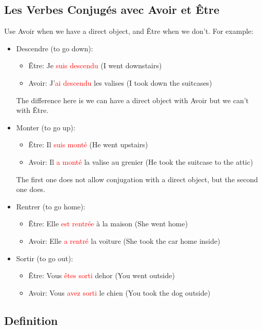 \documentclass{book}
\begin{document}
\subsection{Les Verbes Conjugés avec Avoir et Être}
Use Avoir when we have a direct object, and Être when we don't. For example:
\begin{itemize}
    \item Descendre (to go down):
    \begin{itemize}
        \item Être: Je \textcolor{red}{suis descendu} (I went downstairs)
        \item Avoir: J'\textcolor{red}{ai descendu} les valises (I took down the suitcases)
    \end{itemize}
    The difference here is we can have a direct object with Avoir but we can't with Être.

    \item Monter (to go up):
    \begin{itemize}
        \item Être: Il \textcolor{red}{suis monté} (He went upstairs)
        \item Avoir: Il \textcolor{red}{a monté} la valise au grenier (He took the suitcase to the attic)
    \end{itemize}
    The first one does not allow conjugation with a direct object, but the second one does.

    \item Rentrer (to go home):
    \begin{itemize}
        \item Être: Elle \textcolor{red}{est rentrée} à la maison (She went home)
        \item Avoir: Elle \textcolor{red}{a rentré} la voiture (She took the car home inside)
    \end{itemize}
    
    \item Sortir (to go out):
    \begin{itemize}
        \item Être: Vous \textcolor{red}{êtes sorti} dehor (You went outside)
        \item Avoir: Vous \textcolor{red}{avez sorti} le chien (You took the dog outside)
    \end{itemize}
\end{itemize}

\subsection{Definition}
\end{document}
